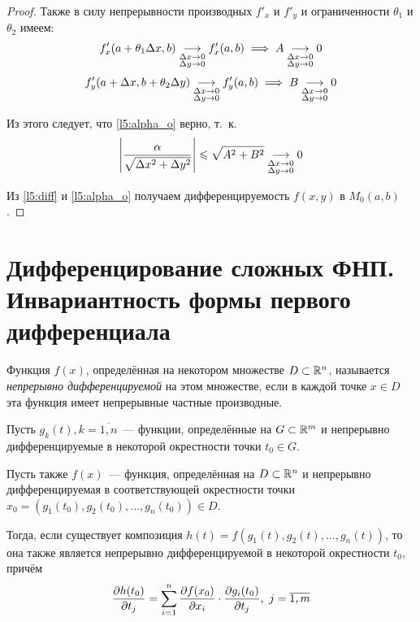 \documentclass[../../main.tex]{subfiles}
\begin{document}
\begin{proof}
Также в силу непрерывности производных $f'_x$ и $f'_y$ 
и ограниченности $\theta_1$ и $\theta_2$ имеем:
\[f'_x(a+\theta_1\Delta x,b)\underset{\substack{\Delta x\to 0 \\
\Delta y \to 0}}\longrightarrow f'_x(a,b)
\implies A \underset{\substack{\Delta x\to 0 \\
\Delta y \to 0}}\longrightarrow 0\]
\[f'_y(a+\Delta x, b+\theta_2\Delta y) \underset{\substack{\Delta x\to 0 \\
\Delta y \to 0}}\longrightarrow f'_y(a,b)
\implies B \underset{\substack{\Delta x\to 0 \\\Delta y \to 0}}\longrightarrow 0\]

Из этого следует, что \eqref{l5:alpha_o} верно, т.~к.
\[\left|{\frac{\alpha}{\sqrt{\Delta x^2 + \Delta y^2}}}\right| \leqslant
\sqrt{A^2+B^2} \underset{\substack{\Delta x\to 0 \\
\Delta y \to 0}}\longrightarrow 0\]

Из \eqref{l5:diff} и \eqref{l5:alpha_o} получаем дифференцируемость
$f(x,y)$ в $M_0(a,b)$.
\end{proof}

\section{Дифференцирование сложных ФНП. Инвариантность 
формы первого дифференциала}
\begin{defn}
Функция $f(x)$, определённая на некотором множестве $D\subset\mathbb{R}^n$,
называется \emph{непрерывно дифференцируемой} на 
этом множестве, если в каждой точке $x\in D$
 эта функция имеет непрерывные частные производные.
\end{defn}
\begin{thm}
Пусть $g_k(t),k=\overline{1,n}$~--- функции, определённые на 
$G\subset\mathbb{R}^m$ и непрерывно дифференцируемые в некоторой окрестности 
точки $t_0\in G$.

Пусть также $f(x)$~--- функция, определённая на $D\subset\mathbb{R}^n$ и
непрерывно дифференцируемая в соответствующей окрестности точки $x_0 = 
(g_1(t_0),g_2(t_0),\dots,g_n(t_0))\in D$.

Тогда, если существует композиция $h(t) =
f(g_1(t),g_2(t),\dots,g_n(t))$, то она также является непрерывно 
дифференцируемой в некоторой окрестности $t_0$, причём
\[\frac{\partial h(t_0)}{\partial t_j}=\sum_{i=1}^{n}
\frac{\partial f(x_0)}{\partial x_i}\cdot
\frac{\partial g_i(t_0)}{\partial t_j},\ j=\overline{1,m}\]
\end{thm}
\end{document}
